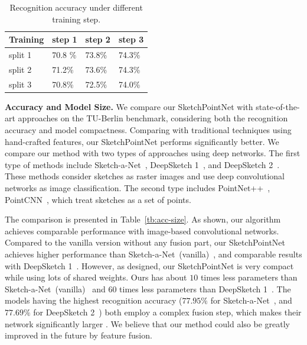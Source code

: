\begin{table}[htbp]
\centering
\caption{Recognition accuracy under different training step.}
\label{tbl:iteration}
\begin{tabular}{l|lll}
    \hline
     Training& step 1&  step 2& step 3\\
    \hline
     split 1& 70.8 \% & 73.8\% & 74.3\% \\
     split 2& 71.2\% & 73.6\% & 74.3\% \\
     split 3& 70.8\% & 72.5\% & 74.0\% \\
    \hline
\end{tabular}
\end{table}



\noindent\textbf{Accuracy and Model Size.}
%
We compare our SketchPointNet with state-of-the-art approaches on the TU-Berlin benchmark, considering both the recognition accuracy and model compactness.
%
Comparing with traditional techniques using hand-crafted features, our SketchPointNet performs significantly better.
%
We compare our method with two types of approaches using deep networks.
The first type of methods include Sketch-a-Net~\cite{Yu2015SketchaNetTB}, DeepSketch 1~\cite{Seddati2015DeepSketchDC}, and DeepSketch 2~\cite{Dupont2016DeepSketch2D}.
These methods consider sketches as raster images and use deep convolutional networks as image classification. 
The second type includes PointNet++~\cite{qi2017pointnetplusplus}, PointCNN~\cite{1801.07791}, which treat sketches as a set of points. 


The comparison is presented in Table~\ref{tb:acc-size}. 
As shown, our algorithm achieves comparable performance  with image-based convolutional networks. 
%
Compared to the vanilla version without any fusion part, our SketchPointNet achieves higher performance than Sketch-a-Net~(vanilla)~\cite{Yu2015SketchaNetTB}, and comparable results with DeepSketch 1~\cite{Seddati2015DeepSketchDC}.
However, as designed, our SketchPointNet is very compact while using lots of shared weights. 
Ours has about $10$ times less parameters than Sketch-a-Net~(vanilla)~\cite{Yu2015SketchaNetTB} and $60$ times less parameters than DeepSketch 1~\cite{Seddati2015DeepSketchDC}.
%
The models having the highest recognition accuracy ($77.95\%$ for Sketch-a-Net~\cite{Yu2015SketchaNetTB}, and $77.69\%$ for DeepSketch 2~\cite{Dupont2016DeepSketch2D}) both employ a complex fusion step, which makes their network significantly larger .
%
We believe that our method could also be greatly improved in the future by feature fusion. 


